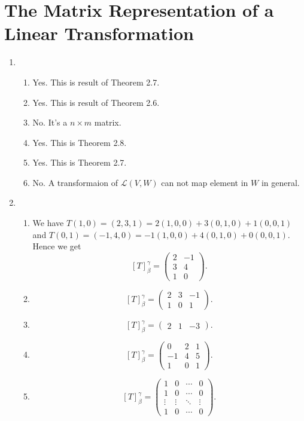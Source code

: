 \section{The Matrix Representation of a Linear Transformation}
\begin{enumerate}
\item \begin{enumerate}
\item Yes. This is result of Theorem 2.7.
\item Yes. This is result of Theorem 2.6.
\item No. It's a $n\times m $ matrix.
\item Yes. This is Theorem 2.8.
\item Yes. This is Theorem 2.7.
\item No. A transformaion of $\mathcal{L}(V,W)$ can not map element in $W$ in general.
\end{enumerate}
\item \begin{enumerate}
\item We have $T(1,0)=(2,3,1)=2(1,0,0)+3(0,1,0)+1(0,0,1)$ and $T(0,1)=(-1,4,0)=-1(1,0,0)+4(0,1,0)+0(0,0,1)$. Hence we get \[[T]_{\beta }^{\gamma}=\left(\begin{array}{cc}2&-1\\3&4\\1&0 \end{array}\right).\]
\item \[[T]_{\beta }^{\gamma}=\left(\begin{array}{ccc}2&3&-1\\1&0&1 \end{array}\right).\]
\item \[[T]_{\beta }^{\gamma}=\left(\begin{array}{ccc}2&1&-3 \end{array}\right).\]
\item \[[T]_{\beta }^{\gamma}=\left(\begin{array}{ccc}0&2&1\\-1&4&5\\1&0&1 \end{array}\right).\]
\item \[[T]_{\beta }^{\gamma}=\left(\begin{array}{cccc}1&0&\cdots &0\\1&0&\cdots &0\\ \vdots &\vdots &\ddots &\vdots \\1&0& \cdots &0 \end{array}\right).\]

\end{enumerate}
\end{enumerate}
